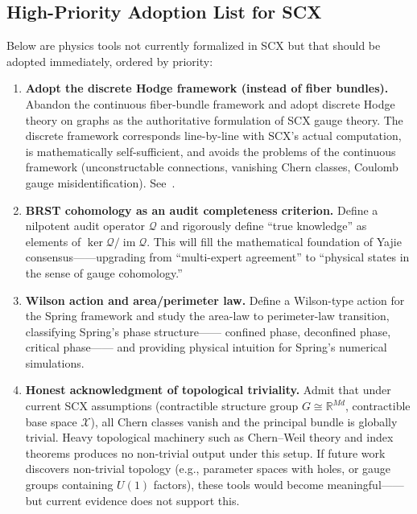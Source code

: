 \documentclass[12pt,a4paper]{article}
\theoremstyle{remark}
\newcommand{\R}{\mathbb{R}}
\begin{document}
\subsection{High-Priority Adoption List for SCX}

Below are physics tools not currently formalized in SCX but that should be adopted immediately, ordered by priority:

\begin{enumerate}[label=\textbf{Priority \arabic*:}]
    \item \textbf{Adopt the discrete Hodge framework (instead of fiber bundles).}
    Abandon the continuous fiber-bundle framework and adopt discrete Hodge theory on graphs as the authoritative formulation of SCX gauge theory.
    The discrete framework corresponds line-by-line with SCX's actual computation, is mathematically self-sufficient, and avoids the problems of the
    continuous framework (unconstructable connections, vanishing Chern classes, Coulomb gauge misidentification).
    See~\cite{scx_fiber_bundle}.\\[2pt]

    \item \textbf{BRST cohomology as an audit completeness criterion.}
    Define a nilpotent audit operator $\mathcal{Q}$ and rigorously
    define ``true knowledge'' as elements of $\ker\mathcal{Q}/\operatorname{im}\mathcal{Q}$.
    This will fill the mathematical foundation of Yajie consensus——upgrading from ``multi-expert agreement'' to
    ``physical states in the sense of gauge cohomology.''\\[2pt]

    \item \textbf{Wilson action and area/perimeter law.}
    Define a Wilson-type action for the Spring framework and study the area-law to
    perimeter-law transition, classifying Spring's phase structure——
    confined phase, deconfined phase, critical phase——
    and providing physical intuition for Spring's numerical simulations.\\[2pt]

    \item \textbf{Honest acknowledgment of topological triviality.}
    Admit that under current SCX assumptions (contractible structure group $G \cong \R^{Md}$, contractible base space $\mathcal{X}$),
    all Chern classes vanish and the principal bundle is globally trivial. Heavy topological machinery such as Chern--Weil theory and index theorems
    produces no non-trivial output under this setup. If future work discovers non-trivial topology
    (e.g., parameter spaces with holes, or gauge groups containing $U(1)$ factors),
    these tools would become meaningful——but current evidence does not support this.
    \\[2pt]


\end{enumerate}
\end{document}
